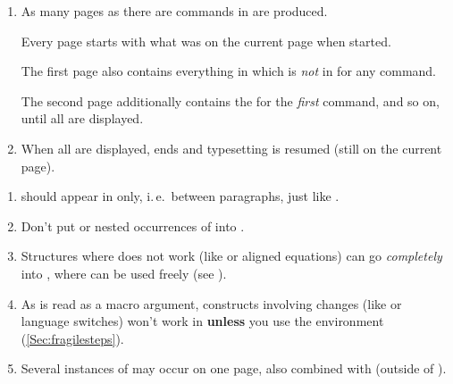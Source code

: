 \begin{slide}
\begin{enumerate}
  \item As many pages as there are  commands in  are produced.

    Every page starts with what was on the current page when  started.

    \newslide

    The first page also contains everything in  which is \emph{not} in  for any
     command.

    The second page additionally contains the  for the \emph{first}  command, and so
    on, until all  are displayed.

  \item When all  are displayed,  ends and typesetting is resumed (still on the
    current page).
  \end{enumerate}


  \newslide

  \begin{enumerate}
  \item {} should appear in  only, i.\,e.\ between paragraphs, just like
    .

  \item Don't put  or nested occurrences of  into .

  \item Structures where  does not work (like  or aligned equations) can go
    \emph{completely} into , where  can be used freely (see ).

  \item As  is read as a macro argument, constructs involving  changes (like
     or language switches) won't work in  \textbf{unless} you use the
     environment (\ref{Sec:fragilesteps}).

\newslide

  \item Several instances of  may occur on one page, also combined with  (outside
    of ).


\end{enumerate}
\end{slide}
